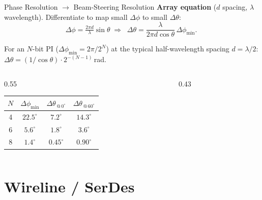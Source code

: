 \documentclass[10pt, aspectratio=169]{beamer}
\begin{document}
\begin{frame}{Phase Resolution $\to$ Beam-Steering Resolution}
  \textbf{Array equation} ($d$ spacing, $\lambda$ wavelength).
  Differentiate to map small $\Delta\phi$ to small $\Delta\theta$:
  \[
    \Delta\phi = \tfrac{2\pi d}{\lambda}\sin\theta
    \;\Longrightarrow\;
    \boxed{\;\Delta\theta
      = \frac{\lambda}{2\pi d\cos\theta}\,\Delta\phi_{\min}.\;}
  \]

  For an $N$-bit PI ($\Delta\phi_{\min} = 2\pi/2^N$) at the typical
  half-wavelength spacing $d=\lambda/2$:
  $\Delta\theta = (1/\cos\theta)\cdot 2^{-(N-1)}\,$rad.

  \begin{columns}[T]
    \begin{column}{0.55\linewidth}
      \centering\footnotesize
      \begin{tabular}{@{}cccc@{}}
        \toprule
        $N$ & $\Delta\phi_{\min}$ & $\Delta\theta_{\,@\,0^\circ}$
                                  & $\Delta\theta_{\,@\,60^\circ}$ \\
        \midrule
        4 & $22.5^\circ$ & $7.2^\circ$  & $14.3^\circ$ \\
        6 & $5.6^\circ$  & $1.8^\circ$  & $3.6^\circ$  \\
        8 & $1.4^\circ$  & $0.45^\circ$ & $0.90^\circ$ \\
        \bottomrule
      \end{tabular}
    \end{column}
    \begin{column}{0.43\linewidth}
    \end{column}
  \end{columns}
\end{frame}

\section{Wireline / SerDes}
\end{document}
